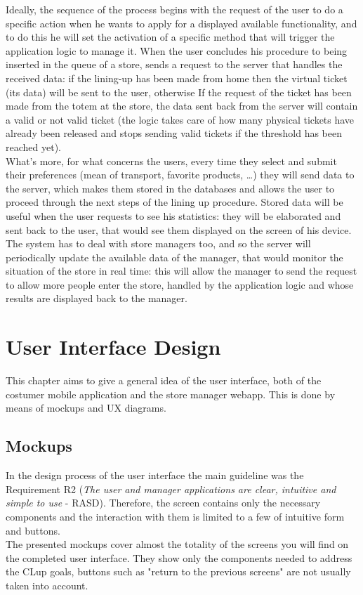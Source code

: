 \documentclass[]{article}
\begin{document}
\begin{paragraph}
					
					Ideally, the sequence of the process begins with the request of the user to do a specific action when he wants to apply for a displayed available functionality, and to do this he will set the activation of a specific method that will trigger the application logic to manage it.
When the user concludes his procedure to being inserted in the queue of a store, sends a request to the server that handles the received data: if the lining-up has been made from home then the virtual ticket (its data) will be sent to the user, otherwise If the request of the ticket has been made from the totem at the store, the data sent back from the server will contain a valid or not valid ticket (the logic takes care of how many physical tickets have already been released and stops  sending valid tickets if the threshold has been reached yet).\\
					\newline
What’s more, for what concerns the users, every time they select and submit their preferences (mean of transport, favorite products, …) they will send data to the server, which makes them stored in the databases and allows the user to proceed through the next steps of the lining up procedure. Stored data will be useful when the user requests to see his statistics: they will be elaborated and sent back to the user, that would see them displayed on the screen of his device.\\
					\newline
The system has to deal with store managers too, and so the server will periodically update the available data of the manager, that would monitor the situation of the store in real time: this will allow the manager to send the request to allow more people enter the store, handled by the application logic and whose results are displayed back to the manager.

				
				\end {paragraph}
				
	\newpage			
				
	\section{User Interface Design}
	This chapter aims to give a general idea of the user interface, both of the costumer mobile application and the store manager webapp. 
	This is done by means of mockups and UX diagrams.
		
		\subsection{Mockups}
		In the design process of the user interface the main guideline was the Requirement R2 (\textit{The user and manager applications are clear, intuitive and simple to use} - RASD). Therefore, the screen contains only the necessary components and the interaction with them is limited to a few of intuitive form and buttons.
		\\The presented mockups cover almost the totality of the screens you will find on the completed user interface. They show only the components needed to address the CLup goals, buttons such as "return to the previous screens" are not usually taken into account.
		
\end{document}
